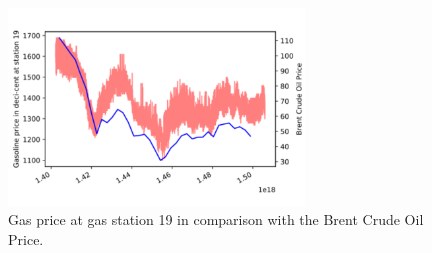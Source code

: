 \begin{figure}
  \centering
    \includegraphics[width=0.7\textwidth
    ]{img/comparison-gas-and-oil-price.pdf}
    \caption{Gas price at gas station 19 in comparison with the Brent Crude Oil Price.}
    \label{comparison-gas-and-oil-price}
\end{figure}